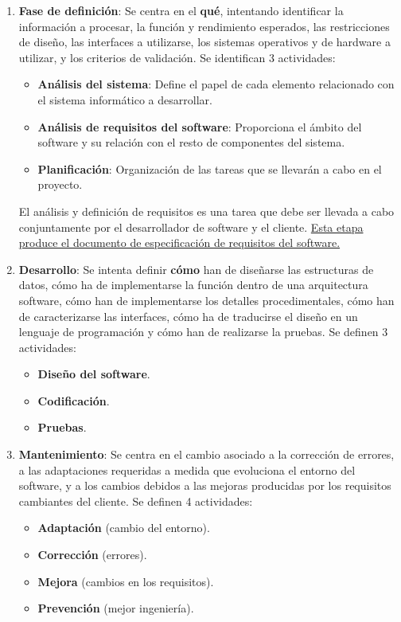 \begin{enumerate}
    \item \textbf{Fase de definición}: Se centra en el \textbf{qué}, intentando identificar la información a procesar, la función y rendimiento esperados, las restricciones de diseño, las interfaces a utilizarse, los sistemas operativos y de hardware a utilizar, y los criterios de validación. Se identifican 3 actividades:
    \begin{itemize}
        \item \textbf{Análisis del sistema}: Define el papel de cada elemento relacionado con el sistema informático a desarrollar.
        \item \textbf{Análisis de requisitos del software}: Proporciona el ámbito del software y su relación con el resto de componentes del sistema.
        \item \textbf{Planificación}: Organización de las tareas que se llevarán a cabo en el proyecto.
    \end{itemize}
    El análisis y definición de requisitos es una tarea que debe ser llevada a cabo conjuntamente por el desarrollador de software y el cliente. \uline{Esta etapa produce el documento de especificación de requisitos del software.}
    \item \textbf{Desarrollo}: Se intenta definir \textbf{cómo} han de diseñarse las estructuras de datos, cómo ha de implementarse la función dentro de una arquitectura software, cómo han de implementarse los detalles procedimentales, cómo han de caracterizarse las interfaces, cómo ha de traducirse el diseño en un lenguaje de programación y cómo han de realizarse la pruebas. Se definen 3 actividades: 
    \begin{itemize}
        \item \textbf{Diseño del software}.
        \item \textbf{Codificación}.
        \item \textbf{Pruebas}.
    \end{itemize}
    \item \textbf{Mantenimiento}: Se centra en el cambio asociado a la corrección de errores, a las adaptaciones requeridas a medida que evoluciona el entorno del software, y a los cambios debidos a las mejoras producidas por los requisitos cambiantes del cliente. Se definen 4 actividades:
    \begin{itemize}
        \item \textbf{Adaptación} (cambio del entorno).
        \item \textbf{Corrección} (errores).
        \item \textbf{Mejora} (cambios en los requisitos).
        \item \textbf{Prevención} (mejor ingeniería).
    \end{itemize}
\end{enumerate}

